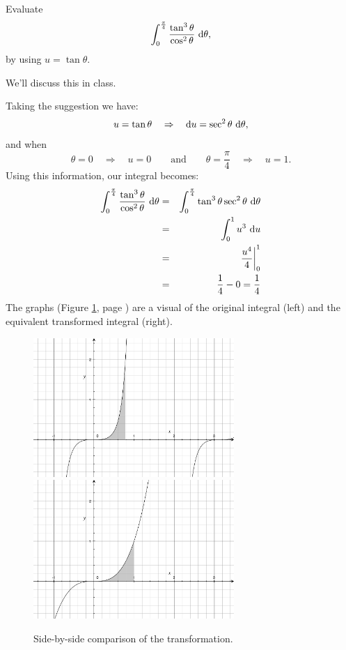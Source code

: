 \documentclass[12pt,addpoints, answers, fleqn]{exam}
\begin{document}
\begin{questions}
\question Evaluate
\[
\int_0^{\frac{\pi}{4}} \frac{\tan^3 \theta }{ \cos^2 \theta}  \ {\rm{d}} \theta,
\]
by using $u = \tan \theta$.

\begin{solution}
We'll discuss this in class.

Taking the suggestion we have:
\[
u = \tan \theta \quad \Rightarrow \quad {\rm{d}} u = \sec^2  \theta\ {\rm{d}}  \theta,
\]
and when
\[
\theta = 0 \quad \Rightarrow \quad u = 0 \qquad \mbox{and}\qquad
\theta = \frac{\pi}{4} \quad \Rightarrow \quad u = 1. 
\]
Using this information, our integral becomes:
\begin{eqnarray*}
\int_0^{\frac{\pi}{4}} \frac{\tan^3 \theta }{ \cos^2 \theta}  \ {\rm{d}} \theta &=& \int_0^{\frac{\pi}{4}} \tan^3 \theta \sec^2 \theta \ {\rm{d}} \theta\\
&=& \int_{0}^{1}  u^3 \ {\rm{d}} u\\
&=& \left. \frac{u^4}{4} \right|_0^1\\
&=& \frac{1}{4} - 0 = \frac{1}{4}
\end{eqnarray*}
The graphs (Figure \ref{fig:graph3009}, page \pageref{fig:graph3009})  are a visual of the original integral (left) and the equivalent transformed integral (right). 
\end{solution}
\begin{figure}[htbp] %
   \centering
   \includegraphics[width=3in]{./graphics/graph3009.pdf}
   \includegraphics[width=3in]{./graphics/graph3010.pdf} 
   \caption{Side-by-side comparison of the transformation.}
   \label{fig:graph3009}
\end{figure}




\end{questions}
\end{document}
